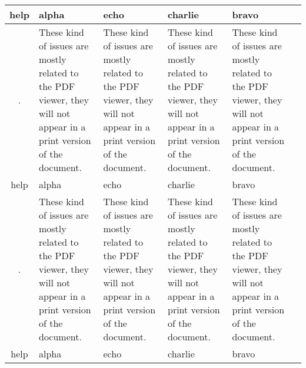 \documentclass[landscape, 12pt]{article}
\begin{document}
\begin{longtable}{| c | L{4cm} | L{5cm} | L{5cm} | L{4cm} | L{4cm} |}
           \hline
           help & alpha & echo & charlie & bravo \\
            \hline
           . & These kind of issues are mostly related to the PDF viewer, they will not appear in a print version of the document. & These kind of issues are mostly related to the PDF viewer, they will not appear in a print version of the document. & These kind of issues are mostly related to the PDF viewer, they will not appear in a print version of the document. & These kind of issues are mostly related to the PDF viewer, they will not appear in a print version of the document. \\
           \hline
           help & alpha & echo & charlie & bravo \\
          \hline
           . & These kind of issues are mostly related to the PDF viewer, they will not appear in a print version of the document. & These kind of issues are mostly related to the PDF viewer, they will not appear in a print version of the document. & These kind of issues are mostly related to the PDF viewer, they will not appear in a print version of the document. & These kind of issues are mostly related to the PDF viewer, they will not appear in a print version of the document. \\
           \hline
           help & alpha & echo & charlie & bravo \\
            \hline
        \end{longtable}
     
\end{document}
